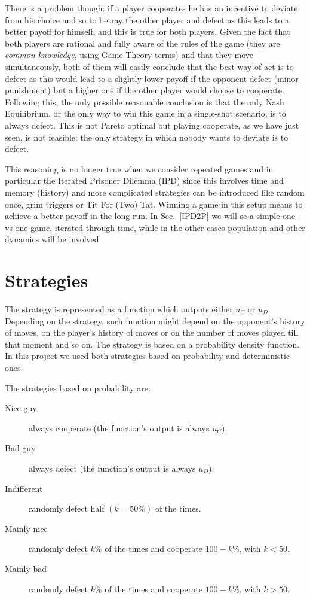 \documentclass[journal,a4paper,10pt,twoside,draft]{IEEEtran}
\begin{document}
There is a problem though: if a player cooperates he has an incentive to deviate from his choice and so to betray the other player and defect as this leads to a better payoff for himself, and this is true for both players. 
Given the fact that both players are rational and fully aware of the rules of the game (they are \textit{common knowledge}, using Game Theory terms) and that they move simultaneously, both of them will easily conclude that the best way of act is to defect as this would lead to a slightly lower payoff if the opponent defect (minor punishment) but a higher one if the other player would choose to cooperate.
Following this, the only possible reasonable conclusion is that the only Nash Equilibrium, or the only way to win this game in a single-shot scenario, is to always defect.
This is not Pareto optimal but playing cooperate, as we have just seen, is not feasible: the only strategy in which nobody wants to deviate is to defect.

This reasoning is no longer true when we consider repeated games and in particular the Iterated Prisoner Dilemma (IPD) since this involves time and memory (history) and more complicated strategies can be introduced like random once, grim triggers or Tit For (Two) Tat.
Winning a game in this setup means to achieve a better payoff in the long run. In Sec.~\ref{IPD2P} we will se a simple one-vs-one game, iterated through time, while in the other cases population and other dynamics will be involved.

\section{Strategies} \label{Strategies}

The strategy is represented as a function which outputs either $u_C$ or $u_D$. Depending on the strategy, such function might depend on the opponent's history of moves, on the player's history of moves or on the number of moves played till that moment and so on.
The strategy is based on a probability density function. In this project we used both strategies based on probability and deterministic ones.

The strategies based on probability are:

\begin{description}
    \item[Nice guy] always cooperate (the function's output is always $u_C$).
    \item[Bad guy] always defect (the function's output is always $u_D$).
    \item[Indifferent] randomly defect half $(k=50\%)$ of the times.
    \item[Mainly nice] randomly defect $k\%$ of the times and cooperate $100-k\%$, with $k<50$.
    \item[Mainly bad] randomly defect $k\%$ of the times and cooperate $100-k\%$, with $k>50$.
\end{description}
\end{document}
